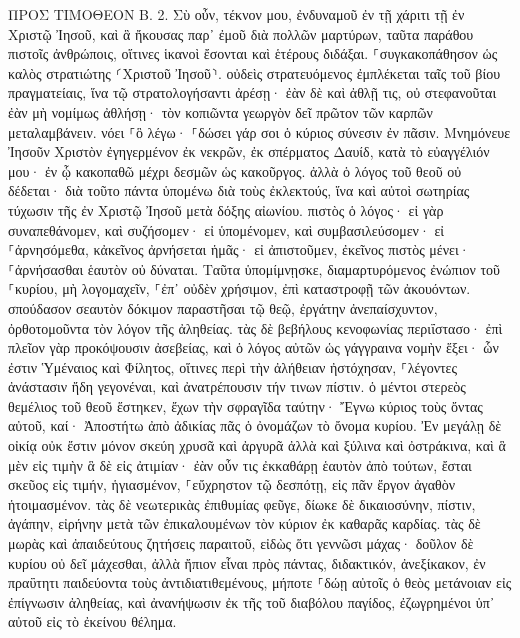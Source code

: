 \documentclass[twoside, 9pt]{extreport}
\begin{document}
ΠΡΟΣ ΤΙΜΟΘΕΟΝ Β.
2.
Σὺ οὖν, τέκνον μου, ἐνδυναμοῦ ἐν τῇ χάριτι τῇ ἐν Χριστῷ Ἰησοῦ, 
καὶ ἃ ἤκουσας παρ᾽ ἐμοῦ διὰ πολλῶν μαρτύρων, ταῦτα παράθου πιστοῖς ἀνθρώποις, οἵτινες ἱκανοὶ ἔσονται καὶ ἑτέρους διδάξαι. 
⸀συγκακοπάθησον ὡς καλὸς στρατιώτης ⸂Χριστοῦ Ἰησοῦ⸃. 
οὐδεὶς στρατευόμενος ἐμπλέκεται ταῖς τοῦ βίου πραγματείαις, ἵνα τῷ στρατολογήσαντι ἀρέσῃ· 
ἐὰν δὲ καὶ ἀθλῇ τις, οὐ στεφανοῦται ἐὰν μὴ νομίμως ἀθλήσῃ· 
τὸν κοπιῶντα γεωργὸν δεῖ πρῶτον τῶν καρπῶν μεταλαμβάνειν. 
νόει ⸀ὃ λέγω· ⸀δώσει γάρ σοι ὁ κύριος σύνεσιν ἐν πᾶσιν. 
Μνημόνευε Ἰησοῦν Χριστὸν ἐγηγερμένον ἐκ νεκρῶν, ἐκ σπέρματος Δαυίδ, κατὰ τὸ εὐαγγέλιόν μου· 
ἐν ᾧ κακοπαθῶ μέχρι δεσμῶν ὡς κακοῦργος. ἀλλὰ ὁ λόγος τοῦ θεοῦ οὐ δέδεται· 
διὰ τοῦτο πάντα ὑπομένω διὰ τοὺς ἐκλεκτούς, ἵνα καὶ αὐτοὶ σωτηρίας τύχωσιν τῆς ἐν Χριστῷ Ἰησοῦ μετὰ δόξης αἰωνίου. 
πιστὸς ὁ λόγος· εἰ γὰρ συναπεθάνομεν, καὶ συζήσομεν· 
εἰ ὑπομένομεν, καὶ συμβασιλεύσομεν· εἰ ⸀ἀρνησόμεθα, κἀκεῖνος ἀρνήσεται ἡμᾶς· 
εἰ ἀπιστοῦμεν, ἐκεῖνος πιστὸς μένει· ⸀ἀρνήσασθαι ἑαυτὸν οὐ δύναται. 
Ταῦτα ὑπομίμνῃσκε, διαμαρτυρόμενος ἐνώπιον τοῦ ⸀κυρίου, μὴ λογομαχεῖν, ⸀ἐπ᾽ οὐδὲν χρήσιμον, ἐπὶ καταστροφῇ τῶν ἀκουόντων. 
σπούδασον σεαυτὸν δόκιμον παραστῆσαι τῷ θεῷ, ἐργάτην ἀνεπαίσχυντον, ὀρθοτομοῦντα τὸν λόγον τῆς ἀληθείας. 
τὰς δὲ βεβήλους κενοφωνίας περιΐστασο· ἐπὶ πλεῖον γὰρ προκόψουσιν ἀσεβείας, 
καὶ ὁ λόγος αὐτῶν ὡς γάγγραινα νομὴν ἕξει· ὧν ἐστιν Ὑμέναιος καὶ Φίλητος, 
οἵτινες περὶ τὴν ἀλήθειαν ἠστόχησαν, ⸀λέγοντες ἀνάστασιν ἤδη γεγονέναι, καὶ ἀνατρέπουσιν τήν τινων πίστιν. 
ὁ μέντοι στερεὸς θεμέλιος τοῦ θεοῦ ἕστηκεν, ἔχων τὴν σφραγῖδα ταύτην· Ἔγνω κύριος τοὺς ὄντας αὐτοῦ, καί· Ἀποστήτω ἀπὸ ἀδικίας πᾶς ὁ ὀνομάζων τὸ ὄνομα κυρίου. 
Ἐν μεγάλῃ δὲ οἰκίᾳ οὐκ ἔστιν μόνον σκεύη χρυσᾶ καὶ ἀργυρᾶ ἀλλὰ καὶ ξύλινα καὶ ὀστράκινα, καὶ ἃ μὲν εἰς τιμὴν ἃ δὲ εἰς ἀτιμίαν· 
ἐὰν οὖν τις ἐκκαθάρῃ ἑαυτὸν ἀπὸ τούτων, ἔσται σκεῦος εἰς τιμήν, ἡγιασμένον, ⸀εὔχρηστον τῷ δεσπότῃ, εἰς πᾶν ἔργον ἀγαθὸν ἡτοιμασμένον. 
τὰς δὲ νεωτερικὰς ἐπιθυμίας φεῦγε, δίωκε δὲ δικαιοσύνην, πίστιν, ἀγάπην, εἰρήνην μετὰ τῶν ἐπικαλουμένων τὸν κύριον ἐκ καθαρᾶς καρδίας. 
τὰς δὲ μωρὰς καὶ ἀπαιδεύτους ζητήσεις παραιτοῦ, εἰδὼς ὅτι γεννῶσι μάχας· 
δοῦλον δὲ κυρίου οὐ δεῖ μάχεσθαι, ἀλλὰ ἤπιον εἶναι πρὸς πάντας, διδακτικόν, ἀνεξίκακον, 
ἐν πραΰτητι παιδεύοντα τοὺς ἀντιδιατιθεμένους, μήποτε ⸀δώῃ αὐτοῖς ὁ θεὸς μετάνοιαν εἰς ἐπίγνωσιν ἀληθείας, 
καὶ ἀνανήψωσιν ἐκ τῆς τοῦ διαβόλου παγίδος, ἐζωγρημένοι ὑπ᾽ αὐτοῦ εἰς τὸ ἐκείνου θέλημα. 
\end{document}
